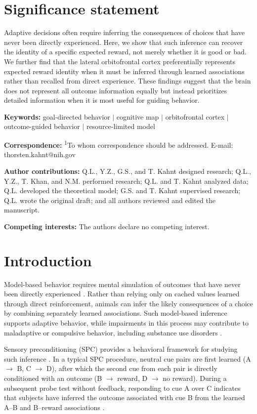 \documentclass[12pt,letterpaper]{article}
\begin{document}
\section*{Significance statement}
Adaptive decisions often require inferring the consequences of choices that have never been directly experienced. Here, we show that such inference can recover the identity of a specific expected reward, not merely whether it is good or bad. We further find that the lateral orbitofrontal cortex preferentially represents expected reward identity when it must be inferred through learned associations rather than recalled from direct experience. These findings suggest that the brain does not represent all outcome information equally but instead prioritizes detailed information when it is most useful for guiding behavior.


\noindent\textbf{Keywords:} goal-directed behavior $|$ cognitive map $|$ orbitofrontal cortex $|$ outcome-guided behavior $|$ resource-limited model


\noindent\textbf{Correspondence:} \textsuperscript{1}To whom correspondence should be addressed. E-mail: thorsten.kahnt@nih.gov


\noindent\textbf{Author contributions:} Q.L., Y.Z., G.S., and T. Kahnt designed research; Q.L., Y.Z., T. Khan, and N.M. performed research; Q.L. and T. Kahnt analyzed data; Q.L. developed the theoretical model; G.S. and T. Kahnt supervised research; Q.L. wrote the original draft; and all authors reviewed and edited the manuscript.


\noindent\textbf{Competing interests:} The authors declare no competing interest.

\section*{Introduction}

Model-based behavior requires mental simulation of outcomes that have never been
directly experienced \citep{daw2011model,doll2015model,wangkahnt21}. Rather than relying only on cached values learned through direct reinforcement, animals can infer the likely consequences of a choice by combining separately learned associations. Such model-based inference supports adaptive behavior, while impairments in this process may contribute to maladaptive or compulsive behavior, including substance use disorders \citep{kahsch21,kahnt2023computationally}.

Sensory preconditioning (SPC) provides a behavioral framework for studying such inference \citep{kahnt2023computationally,jones12,wang2020interactions}. In a typical SPC procedure, neutral cue pairs are first learned (A $\rightarrow$ B, C $\rightarrow$ D), after which the second cue from each pair is directly conditioned with an outcome (B $\rightarrow$ reward, D $\rightarrow$ no reward). During a subsequent probe test without feedback, responding to cue A over C indicates that subjects have inferred the outcome associated with cue B from the learned A--B and B--reward associations \citep{Brogden39,jones12,RN515}.
\end{document}
